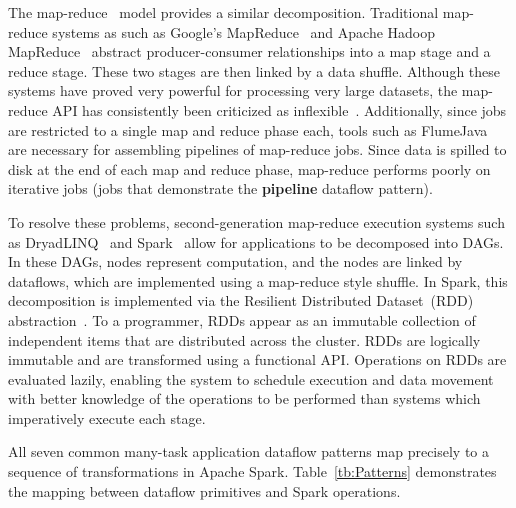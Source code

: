 \documentclass[10pt, conference, compsocconf]{IEEEtran}
\begin{document}
The map-reduce~\cite{dean04} model provides a similar decomposition. Traditional map-reduce
systems as such as Google's MapReduce~\cite{dean04} and Apache Hadoop MapReduce~\cite{HADOOP} abstract
producer-consumer relationships into a map stage and a reduce stage. These two stages are then
linked by a data shuffle. Although these systems have proved very powerful for processing very
large datasets, the map-reduce API has consistently been criticized as inflexible~\cite{dewitt08}.
Additionally, since jobs are restricted to a single map and reduce phase each, tools such as
FlumeJava~\cite{chambers10} are necessary for assembling pipelines of map-reduce jobs. Since
data is spilled to disk at the end of each map and reduce phase, map-reduce performs poorly
on iterative jobs (jobs that demonstrate the \textbf{pipeline} dataflow pattern).

To resolve these problems, second-generation map-reduce execution systems such as
DryadLINQ~\cite{yu08} and Spark~\cite{zaharia12} allow for applications to be decomposed into
DAGs. In these DAGs, nodes represent computation, and the nodes are
linked by dataflows, which are implemented using a map-reduce style shuffle. In Spark,
this decomposition is implemented via the Resilient Distributed Dataset~(RDD)
abstraction~\cite{zaharia12}. To a programmer, RDDs appear as an immutable collection of independent
items that are distributed across the cluster. RDDs are logically immutable and are transformed using a
functional API. 
Operations on RDDs are evaluated lazily, enabling the system to schedule execution and data movement with better knowledge of the operations to be performed than systems which imperatively execute each stage.

All seven common many-task application dataflow patterns map precisely to a sequence of
transformations in \linebreak Apache Spark. Table~\ref{tb:Patterns} demonstrates the mapping between
dataflow primitives and Spark operations.
\end{document}
